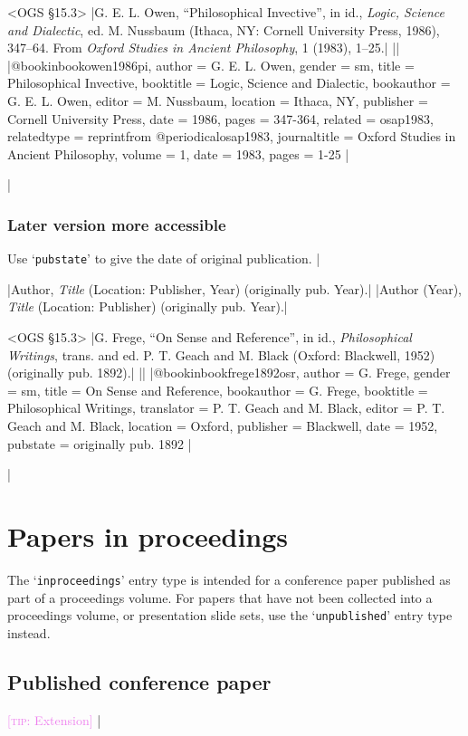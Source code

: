 \documentclass[extrafontsizes,11pt,a4paper,oneside]{memoir}
\newcommand*{\lit}[1]{\textsf{#1}}
\newcommand*{\code}[1]{`\texttt{#1}'}
\newcommand*{\aside}[1]{\textcolor{violet}{[\textsc{tip:} #1]}}
\begin{document}
\bibexample<OGS \S15.3>
|G. E. L. Owen, \enquote{Philosophical Invective}, in id., \emph{Logic, Science and Dialectic}, ed. M. Nussbaum (Ithaca, NY: Cornell University Press, 1986), 347--64. From \emph{Oxford Studies in Ancient Philosophy}, 1 (1983), 1--25.|%
||%
|@bookinbook{owen1986pi,
  author = {G. E. L. Owen},
  gender = {sm},
  title = {Philosophical Invective},
  booktitle = {Logic, Science and Dialectic},
  bookauthor = {G. E. L. Owen},
  editor = {M. Nussbaum},
  location = {Ithaca, NY},
  publisher = {Cornell University Press},
  date = {1986},
  pages = {347-364},
  related = {osap1983},
  relatedtype = {reprintfrom}
}
@periodical{osap1983,
  journaltitle = {Oxford Studies in Ancient Philosophy},
  volume = {1},
  date = {1983},
  pages = {1-25}
}|

\todoc|
\subsection{Later version more accessible}

Use \code{pubstate} to give the date of original publication.
|

\specs
|Author, \emph{Title} (Location: Publisher, Year) (\lit{originally pub.} Year).|%
|Author (Year), \emph{Title} (Location: Publisher) (\lit{originally pub.} Year).|

\bibexample<OGS \S15.3>
|G. Frege, \enquote{On Sense and Reference}, in id., \emph{Philosophical Writings}, trans. and ed. P. T. Geach and M. Black (Oxford: Blackwell, 1952) (originally pub. 1892).|%
||%
|@bookinbook{frege1892osr,
  author = {G. Frege},
  gender = {sm},
  title = {On Sense and Reference},
  bookauthor = {G. Frege},
  booktitle = {Philosophical Writings},
  translator = {P. T. Geach and M. Black},
  editor = {P. T. Geach and M. Black},
  location = {Oxford},
  publisher = {Blackwell},
  date = {1952},
  pubstate = {originally pub\adddotspace 1892}
}|

\todoc|
\chapter{Papers in proceedings}\label{sec:inproceedings}

The \code{inproceedings} entry type is intended for a conference paper published as part of a proceedings volume. For papers that have not been collected into a proceedings volume, or presentation slide sets, use the \code{unpublished} entry type instead.

\section{Published conference paper}
\aside{Extension}
|
\end{document}
